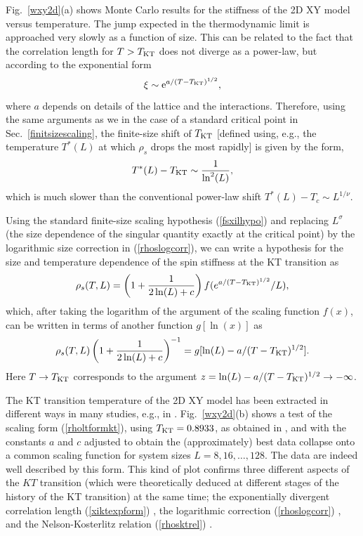\documentclass[draft,numberedheadings]{aipproc}
\begin{document}
Fig.~\ref{wxy2d}(a) shows Monte Carlo results for the stiffness of the 2D XY model versus temperature. The jump expected in the thermodynamic limit is 
approached very slowly as a function of size. This can be related to the fact that the correlation length for $T > T_{\rm KT}$ does not diverge as a power-law,
but according to the exponential form
\begin{equation}
\xi \sim {\rm e}^{a/(T-T_{\rm KT})^{1/2}},
\label{xiktexpform}
\end{equation}
where $a$ depends on details of the lattice and the  interactions. Therefore, using the same arguments as we in the case of a standard critical point in 
Sec.~\ref{finitsizescaling}, the finite-size shift of $T_{\rm KT}$ [defined using, e.g., the temperature $T^*(L)$ at which $\rho_s$ drops
the most rapidly] is given by the form,
\begin{equation}
T^*(L) - T_{\rm KT} \sim \frac{1}{\ln^2(L)},
\end{equation}
which is much slower than the conventional power-law shift $T^*(L)- T_c \sim L^{1/\nu}$.

Using the standard finite-size scaling hypothesis (\ref{fsxilhypo}) and replacing $L^\sigma$ (the size dependence of the singular quantity exactly
at the critical point) by the logarithmic size correction in (\ref{rhoslogcorr}), we can write a hypothesis for the size and temperature dependence 
of the spin stiffness at the KT transition as
\begin{equation}
\rho_s(T,L)=\left ( 1 + \frac{1}{2\ln(L) + c} \right )f(e^{a/(T-T_{\rm KT})^{1/2}}/L),
\end{equation}
which, after taking the logarithm of the argument of the scaling function $f(x)$, can be written in terms of another function $g[\ln(x)]$ as
\begin{equation}
\rho_s(T,L)\left ( 1 + \frac{1}{2\ln(L) + c} \right )^{-1}=g[\ln(L)-a/(T-T_{\rm KT})^{1/2}].
\label{rholtformkt}
\end{equation}
Here $T \to T_{\rm KT}$ corresponds to the argument $z=\ln(L)-a/(T-T_{\rm KT})^{1/2} \to -\infty$.

The KT transition temperature of the 2D XY model has been extracted in different ways in many studies, e.g., in \cite{schultka94,tomita02}. 
Fig.~\ref{wxy2d}(b) shows a test of the scaling form (\ref{rholtformkt}), using $T_{\rm KT}=0.8933$, as obtained in \cite{tomita02}, and with
the constants $a$ and $c$ adjusted to obtain the (approximately) best data collapse onto a common scaling function for system sizes $L=8,16,\ldots,128$. 
The data are indeed well described by this form. This kind of plot confirms three different aspects of the $KT$ transition (which were
theoretically deduced at different stages of the history of the KT transition) at the same time; the exponentially divergent correlation length 
(\ref{xiktexpform}) \cite{kosterlitz73,kosterlitz74}, the logarithmic correction (\ref{rhoslogcorr}) \cite{weber87}, and the Nelson-Kosterlitz 
relation (\ref{rhosktrel}) \cite{nelson77}.
\end{document}
